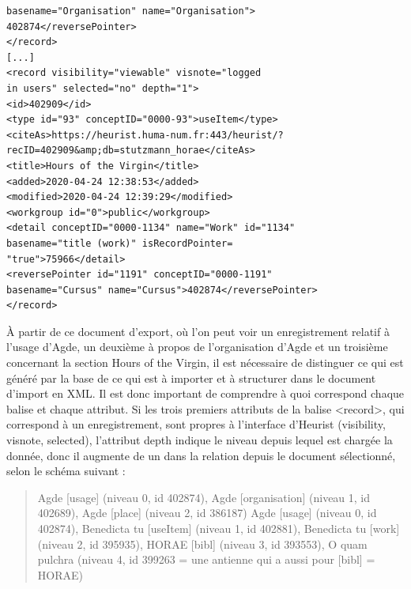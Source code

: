 \documentclass[a4paper,12pt,twoside]{book}
\begin{document}
\begin{verbatim}
basename="Organisation" name="Organisation">
402874</reversePointer>
</record>
[...]
<record visibility="viewable" visnote="logged 
in users" selected="no" depth="1">
<id>402909</id>
<type id="93" conceptID="0000-93">useItem</type>
<citeAs>https://heurist.huma-num.fr:443/heurist/?
recID=402909&amp;db=stutzmann_horae</citeAs>
<title>Hours of the Virgin</title>
<added>2020-04-24 12:38:53</added>
<modified>2020-04-24 12:39:29</modified>
<workgroup id="0">public</workgroup>
<detail conceptID="0000-1134" name="Work" id="1134"
basename="title (work)" isRecordPointer=
"true">75966</detail>
<reversePointer id="1191" conceptID="0000-1191" 
basename="Cursus" name="Cursus">402874</reversePointer>
</record>
	\end{verbatim}
	
À partir de ce document d'export, où l'on peut voir un enregistrement relatif à l'usage d'Agde, un deuxième à propos de l'organisation d'Agde et un troisième concernant la section \og Hours of the Virgin\fg{}, il est nécessaire de distinguer ce qui est généré par la base de ce qui est à importer et à structurer dans le document d'import en XML. Il est donc important de comprendre à quoi correspond chaque balise et chaque attribut. Si les trois premiers attributs de la balise \textless record\textgreater , qui correspond à un enregistrement, sont propres à l'interface d'Heurist (visibility, visnote, selected), l'attribut depth indique le niveau depuis lequel est chargée la donnée, donc il augmente de un dans la relation depuis le document sélectionné, selon le schéma suivant :
\begin{quote}
Agde [usage] (niveau 0, id 402874), Agde [organisation] (niveau 1, id 402689), Agde [place] (niveau 2, id 386187)
Agde [usage] (niveau 0, id 402874), Benedicta tu [useItem] (niveau 1, id 402881), Benedicta tu [work] (niveau 2, id 395935), HORAE [bibl] (niveau 3, id 393553), O quam pulchra (niveau 4, id 399263 = une antienne qui a aussi pour [bibl] = HORAE)   
\end{quote}
\end{document}
